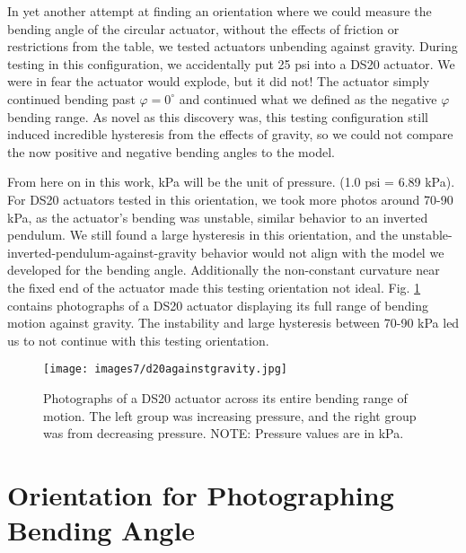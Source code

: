 In yet another attempt at finding an orientation where we could measure the bending angle of the circular actuator, without the effects of friction or restrictions from the table, we tested actuators unbending against gravity. During testing in this configuration, we accidentally put 25 psi into a DS20 actuator. We were in fear the actuator would explode, but it did not! The actuator simply continued bending past $\varphi=0^\circ$ and continued what we defined as the negative $\varphi$ bending range. As novel as this discovery was, this testing configuration still induced incredible hysteresis from the effects of gravity, so we could not compare the now positive and negative bending angles to the model. 

From here on in this work, kPa will be the unit of pressure. (1.0 psi = 6.89 kPa). For DS20 actuators tested in this orientation, we took more photos around 70-90 kPa, as the actuator's bending was unstable, similar behavior to an inverted pendulum. We still found a large hysteresis in this orientation, and the unstable-inverted-pendulum-against-gravity behavior would not align with the model we developed for the bending angle. Additionally the non-constant curvature near the fixed end of the actuator made this testing orientation not ideal. Fig. \ref{fig:d20againstgravity} contains photographs of a DS20 actuator displaying its full range of bending motion against gravity. The instability and large hysteresis between 70-90 kPa led us to not continue with this testing orientation. 

\begin{figure}[h]
    \centering
     \texttt{[image: images7/d20againstgravity.jpg]}
    \caption{Photographs of a DS20 actuator across its entire bending range of motion. The left group was increasing pressure, and the right group was from decreasing pressure. NOTE: Pressure values are in kPa.}
    \label{fig:d20againstgravity}
\end{figure}

\clearpage
\section{Orientation for Photographing Bending Angle}

